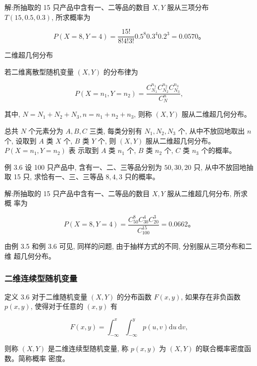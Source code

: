 \documentclass{beamer}
\begin{document}
	\begin{frame}
		解:所抽取的 15 只产品中含有一、二等品的数目 $X, Y$ 服从三项分布 $T(15,0.5,0.3)$, 所求概率为
		
		$$
		P(X=8, Y=4)=\frac{15 !}{8 ! 4 ! 3 !} 0.5^{8} 0.3^{4} 0.2^{3}=0.0570 。
		$$
	\end{frame}
	
	\begin{frame}
		二维超几何分布
		
		若二维离散型随机变量 $(X, Y)$ 的分布律为
		
		$$
		P\left(X=n_{1}, Y=n_{2}\right)=\frac{C_{N_{1}}^{n_{1}} C_{N_{2}}^{n_{2}} C_{N_{3}}^{n_{3}}}{C_{N}^{n}},
		$$
		
		其中, $N=N_{1}+N_{2}+N_{3}, n=n_{1}+n_{2}+n_{3}$, 则称 $(X, Y)$ 服从二维超几何分布。
		
		总共 $N$ 个元素分为 $A, B, C$ 三类, 每类分别有 $N_{1}, N_{2}, N_{3}$ 个, 从中不放回地取出 $n$ 个, 设取到 $A$ 类 $X$ 个, $B$ 类 $Y$ 个, 则 $(X, Y)$ 服从二维超几何分布。 $P\left(X=n_{1}, Y=n_{2}\right)$ 表 示取到 $A$ 类 $n_{1}$ 个, $B$ 类 $n_{2}$ 个, $C$ 类 $n_{3}$ 个的概率。
	\end{frame}
	
	\begin{frame}
		例 3.6 设 100 只产品中, 含有一、二、三等品分别为 $50,30,20$ 只, 从中不放回地抽取 15 只, 求恰有一、三、三等品 $8,4,3$ 只的概率。
	\end{frame}
	
	\begin{frame}
		解:所抽取的 15 只产品中含有一、二等品的数目 $X, Y$ 服从二维超几何分布, 所求概 率为
		
		$$
		P(X=8, Y=4)=\frac{C_{50}^{8} C_{30}^{4} C_{20}^{3}}{C_{100}^{15}}=0.0662 。
		$$
		
		由例 3.5 和例 3.6 可见, 同样的问题, 由于抽样方式的不同, 分别服从三项分布和二维 超几何分布。
	\end{frame}
	 
	\begin{frame}
		\frametitle{二维连续型随机变量}
		定义 3.6 对于二维随机变量 $(X, Y)$ 的分布函数 $F(x, y)$, 如果存在非负函数 $p(x, y)$, 使得对于任意的 $(x, y)$ 有
		
		$$
		F(x, y)=\int_{-\infty}^{x} \int_{-\infty}^{y} p(u, v) \mathrm{d} u \mathrm{~d} v,
		$$
		
		则称 $(X, Y)$ 是二维连续型随机变量, 称 $p(x, y)$ 为 $(X, Y)$ 的联合概率密度函数。简称概率 密度。
	\end{frame}
	
\end{document}
